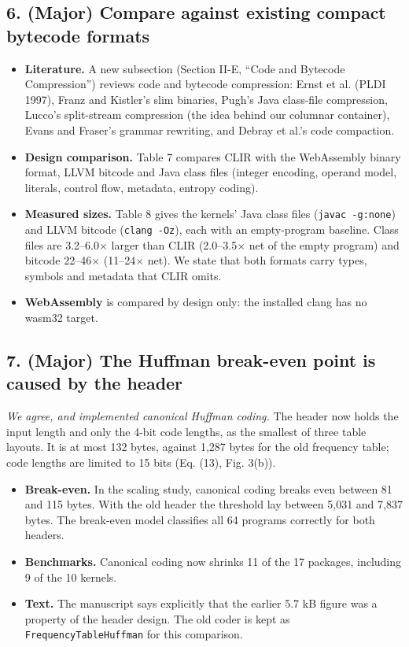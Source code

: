 \documentclass[11pt,a4paper]{article}
\begin{document}
\subsection*{6. (Major) Compare against existing compact bytecode formats}
\begin{itemize}
\item \textbf{Literature.} A new subsection (Section II-E, ``Code and Bytecode Compression'') reviews code and bytecode compression: Ernst et al. (PLDI 1997), Franz and Kistler's slim binaries, Pugh's Java class-file compression, Lucco's split-stream compression (the idea behind our columnar container), Evans and Fraser's grammar rewriting, and Debray et al.'s code compaction.
\item \textbf{Design comparison.} Table 7 compares CLIR with the WebAssembly binary format, LLVM bitcode and Java class files (integer encoding, operand model, literals, control flow, metadata, entropy coding).
\item \textbf{Measured sizes.} Table 8 gives the kernels' Java class files (\texttt{javac -g:none}) and LLVM bitcode (\texttt{clang -Oz}), each with an empty-program baseline. Class files are 3.2--6.0$\times$ larger than CLIR (2.0--3.5$\times$ net of the empty program) and bitcode 22--46$\times$ (11--24$\times$ net). We state that both formats carry types, symbols and metadata that CLIR omits.
\item \textbf{WebAssembly} is compared by design only: the installed clang has no wasm32 target.
\end{itemize}
\subsection*{7. (Major) The Huffman break-even point is caused by the header}
\emph{We agree, and implemented canonical Huffman coding.} The header now holds the input length and only the 4-bit code lengths, as the smallest of three table layouts. It is at most 132 bytes, against 1,287 bytes for the old frequency table; code lengths are limited to 15 bits (Eq. (13), Fig. 3(b)).

\begin{itemize}
\item \textbf{Break-even.} In the scaling study, canonical coding breaks even between 81 and 115 bytes. With the old header the threshold lay between 5,031 and 7,837 bytes. The break-even model classifies all 64 programs correctly for both headers.
\item \textbf{Benchmarks.} Canonical coding now shrinks 11 of the 17 packages, including 9 of the 10 kernels.
\item \textbf{Text.} The manuscript says explicitly that the earlier 5.7 kB figure was a property of the header design. The old coder is kept as \texttt{FrequencyTableHuffman} for this comparison.
\end{itemize}
\end{document}

